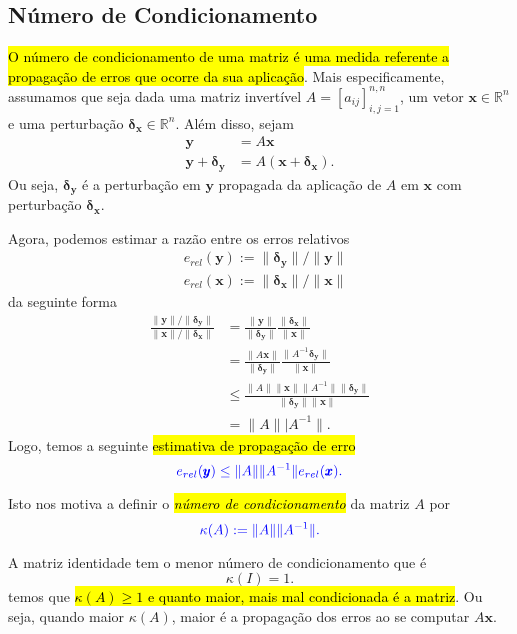 \subsection{Número de Condicionamento}
\badgeRevisar

\hl{O número de condicionamento de uma matriz é uma medida referente a propagação de erros que ocorre da sua aplicação}. Mais especificamente, assumamos que seja dada uma matriz invertível $A = [a_{ij}]_{i,j=1}^{n,n}$, um vetor $\pmb{x}\in\mathbb{R}^n$ e uma perturbação $\pmb{\delta_x}\in\mathbb{R}^n$. Além disso, sejam
\begin{align}
  \pmb{y} &= A\pmb{x}\\
  \pmb{y} + \pmb{\delta_y} &= A(\pmb{x}+\pmb{\delta_x}).
\end{align}
Ou seja, $\pmb{\delta_y}$ é a perturbação em $\pmb{y}$ propagada da aplicação de $A$ em $\pmb{x}$ com perturbação $\pmb{\delta_x}$.

Agora, podemos estimar a razão entre os erros relativos
\begin{align}
  & e_{rel}(\pmb{y}) := \|\pmb{\delta_y}\|/\|\pmb{y}\|\\
  & e_{rel}(\pmb{x}) := \|\pmb{\delta_x}\|/\|\pmb{x}\|
\end{align}
da seguinte forma 
\begin{align}
  \frac{\|\pmb{y}\|/\|\pmb{\delta_y}\|}{\|\pmb{x}\|/\|\pmb{\delta_x}\|} &= \frac{\|\pmb{y}\|}{\|\pmb{\delta_y}\|}\frac{\|\pmb{\delta_x}\|}{\|\pmb{x}\|}\\
  &=\frac{\|A\pmb{x}\|}{\|\pmb{\delta_y}\|}\frac{\|A^{-1}\pmb{\delta_y}\|}{\|\pmb{x}\|} \\
  &\leq \frac{\|A\|\|\pmb{x}\|\|A^{-1}\|\|\pmb{\delta_y}\|}{\|\pmb{\delta_y}\|\|\pmb{x}\|}\\
  &= \|A\||A^{-1}\|.
\end{align}
Logo, temos a seguinte \hl{estimativa de propagação de erro}
\begin{equation}\color{blue}e_{rel}(\pmb{y}) \leq \|A\|\|A^{-1}\|e_{rel}(\pmb{x}).
\end{equation}

Isto nos motiva a definir o \hl{\emph{número de condicionamento}} da matriz $A$ por
\begin{equation}\color{blue}\kappa(A) := \|A\|\|A^{-1}\|.
\end{equation}

A matriz identidade tem o menor número de condicionamento que é
\begin{equation}
  \kappa(I) = 1.
\end{equation}
temos que \hl{$\kappa(A) \geq 1$ e quanto maior, mais mal condicionada é a matriz}. Ou seja, quando maior $\kappa(A)$, maior é a propagação dos erros ao se computar $A\pmb{x}$.

